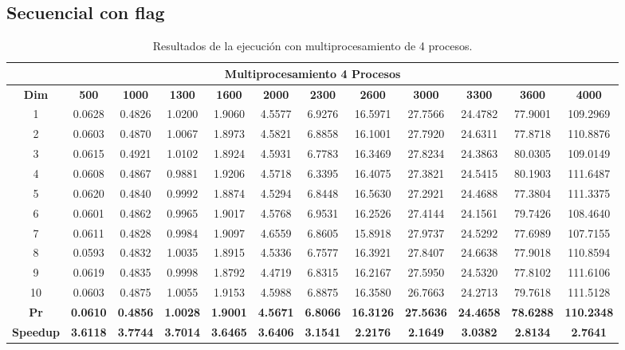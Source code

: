 \documentclass{article}
\begin{document}

\subsection{Secuencial con flag}

\begin{table}[H]
\centering
\tiny
\begin{tabular}{|c|c|c|c|c|c|c|c|c|c|c|c|}
\hline
\multicolumn{12}{|c|}{\textbf{Multiprocesamiento 4 Procesos}} \\
\hline
\textbf{Dim} & \textbf{500} & \textbf{1000} & \textbf{1300} & \textbf{1600} & \textbf{2000} & \textbf{2300} & \textbf{2600} & \textbf{3000} & \textbf{3300} & \textbf{3600} & \textbf{4000} \\
\hline
1  & 0.0628 & 0.4826 & 1.0200 & 1.9060 & 4.5577 & 6.9276 & 16.5971 & 27.7566 & 24.4782 & 77.9001 & 109.2969 \\
2  & 0.0603 & 0.4870 & 1.0067 & 1.8973 & 4.5821 & 6.8858 & 16.1001 & 27.7920 & 24.6311 & 77.8718 & 110.8876 \\
3  & 0.0615 & 0.4921 & 1.0102 & 1.8924 & 4.5931 & 6.7783 & 16.3469 & 27.8234 & 24.3863 & 80.0305 & 109.0149 \\
4  & 0.0608 & 0.4867 & 0.9881 & 1.9206 & 4.5718 & 6.3395 & 16.4075 & 27.3821 & 24.5415 & 80.1903 & 111.6487 \\
5  & 0.0620 & 0.4840 & 0.9992 & 1.8874 & 4.5294 & 6.8448 & 16.5630 & 27.2921 & 24.4688 & 77.3804 & 111.3375 \\
6  & 0.0601 & 0.4862 & 0.9965 & 1.9017 & 4.5768 & 6.9531 & 16.2526 & 27.4144 & 24.1561 & 79.7426 & 108.4640 \\
7  & 0.0611 & 0.4828 & 0.9984 & 1.9097 & 4.6559 & 6.8605 & 15.8918 & 27.9737 & 24.5292 & 77.6989 & 107.7155 \\
8  & 0.0593 & 0.4832 & 1.0035 & 1.8915 & 4.5336 & 6.7577 & 16.3921 & 27.8407 & 24.6638 & 77.9018 & 110.8594 \\
9  & 0.0619 & 0.4835 & 0.9998 & 1.8792 & 4.4719 & 6.8315 & 16.2167 & 27.5950 & 24.5320 & 77.8102 & 111.6106 \\
10 & 0.0603 & 0.4875 & 1.0055 & 1.9153 & 4.5988 & 6.8875 & 16.3580 & 26.7663 & 24.2713 & 79.7618 & 111.5128 \\
\hline
\textbf{Pr} & \textbf{0.0610} & \textbf{0.4856} & \textbf{1.0028} & \textbf{1.9001} & \textbf{4.5671} & \textbf{6.8066} & \textbf{16.3126} & \textbf{27.5636} & \textbf{24.4658} & \textbf{78.6288} & \textbf{110.2348} \\
\hline
\textbf{Speedup} & \textbf{3.6118} & \textbf{3.7744} & \textbf{3.7014} & \textbf{3.6465} & \textbf{3.6406} & \textbf{3.1541} & \textbf{2.2176} & \textbf{2.1649} & \textbf{3.0382} & \textbf{2.8134} & \textbf{2.7641} \\
\hline
\end{tabular}
\label{tab:mp4}
\caption{Resultados de la ejecución con multiprocesamiento de 4 procesos.}
\end{table}
\end{document}
